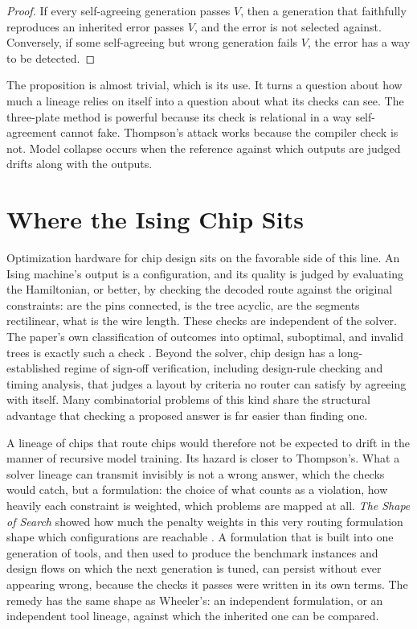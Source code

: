 \documentclass[11pt]{article}
\theoremstyle{definition}
\theoremstyle{remark}
\begin{document}
\begin{proof}
If every self-agreeing generation passes $V$, then a generation that faithfully reproduces an inherited error passes $V$, and the error is not selected against. Conversely, if some self-agreeing but wrong generation fails $V$, the error has a way to be detected.
\end{proof}

The proposition is almost trivial, which is its use. It turns a question about how much a lineage relies on itself into a question about what its checks can see. The three-plate method is powerful because its check is relational in a way self-agreement cannot fake. Thompson's attack works because the compiler check is not. Model collapse occurs when the reference against which outputs are judged drifts along with the outputs.

\section{Where the Ising Chip Sits}

Optimization hardware for chip design sits on the favorable side of this line. An Ising machine's output is a configuration, and its quality is judged by evaluating the Hamiltonian, or better, by checking the decoded route against the original constraints: are the pins connected, is the tree acyclic, are the segments rectilinear, what is the wire length. These checks are independent of the solver. The paper's own classification of outcomes into optimal, suboptimal, and invalid trees is exactly such a check \cite{li2026}. Beyond the solver, chip design has a long-established regime of sign-off verification, including design-rule checking and timing analysis, that judges a layout by criteria no router can satisfy by agreeing with itself. Many combinatorial problems of this kind share the structural advantage that checking a proposed answer is far easier than finding one.

A lineage of chips that route chips would therefore not be expected to drift in the manner of recursive model training. Its hazard is closer to Thompson's. What a solver lineage can transmit invisibly is not a wrong answer, which the checks would catch, but a formulation: the choice of what counts as a violation, how heavily each constraint is weighted, which problems are mapped at all. \emph{The Shape of Search} showed how much the penalty weights in this very routing formulation shape which configurations are reachable \cite{flyxion-shape}. A formulation that is built into one generation of tools, and then used to produce the benchmark instances and design flows on which the next generation is tuned, can persist without ever appearing wrong, because the checks it passes were written in its own terms. The remedy has the same shape as Wheeler's: an independent formulation, or an independent tool lineage, against which the inherited one can be compared.
\end{document}
